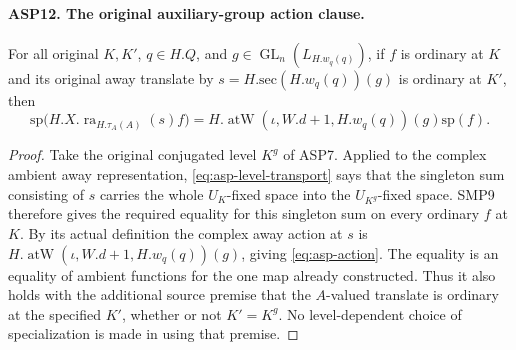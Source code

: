 \paragraph{ASP12. The original auxiliary-group action clause.}
\label{claim:ASP12}
For all original $K,K'$, $q\in H.Q$, and
$g\in\operatorname{GL}_n(L_{H.w_q(q)})$,
if $f$ is ordinary at $K$ and its original
away translate by $s=H.\mathrm{sec}(H.w_q(q))(g)$
is ordinary at $K'$, then
\begin{equation}\label{eq:asp-action}
       \mathrm{sp}\bigl(H.X.\operatorname{ra}_{H.\tau_A(A)}(s)f\bigr)
          =H.\operatorname{atW}(\iota,W.d+1,H.w_q(q))(g)
                                                       \mathrm{sp}(f).
\end{equation}
\begin{proof}
Take the original conjugated level $K^g$ of ASP7.
Applied to the complex ambient away representation,
\eqref{eq:asp-level-transport} says that the singleton
sum consisting of $s$ carries the whole
$U_K$-fixed space into the $U_{K^g}$-fixed space.
SMP9 therefore gives the required equality for
this singleton sum on every ordinary $f$ at $K$.
By its actual definition the complex away action
at $s$ is
$H.\operatorname{atW}(\iota,W.d+1,H.w_q(q))(g)$,
giving \eqref{eq:asp-action}.
The equality is an equality of ambient functions
for the one map already constructed.  Thus it
also holds with the additional source premise
that the $A$-valued translate is ordinary at the
specified $K'$, whether or not $K'=K^g$.
No level-dependent choice of specialization is
made in using that premise.
\end{proof}

